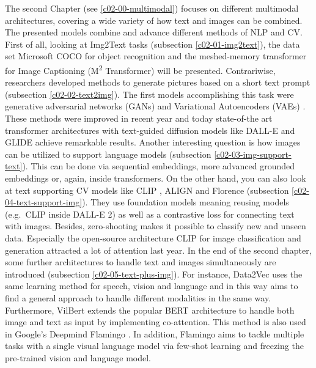 \documentclass[
]{krantz}
\begin{document}
The second Chapter (see \ref{c02-00-multimodal}) focuses on different multimodal architectures, covering a wide variety of how text and images can be combined. The presented models combine and advance different methods of NLP and CV. First of all, looking at Img2Text tasks (subsection \ref{c02-01-img2text}), the data set Microsoft COCO for object recognition \citep{COCO} and the meshed-memory transformer for Image Captioning (M\textsuperscript{2} Transformer) \citep{meshed_memory} will be presented. Contrariwise, researchers developed methods to generate pictures based on a short text prompt (subsection \ref{c02-02-text2img}). The first models accomplishing this task were generative adversarial networks (GANs) \citep{GAN} and Variational Autoencoders (VAEs) \citep{VAE}. These methods were improved in recent year and today state-of-the art transformer architectures with text-guided diffusion models like DALL-E \citep{DALLE} and GLIDE \citep{GLIDE} achieve remarkable results. Another interesting question is how images can be utilized to support language models (subsection \ref{c02-03-img-support-text}). This can be done via sequential embeddings, more advanced grounded embeddings or, again, inside transformers. On the other hand, you can also look at text supporting CV models like CLIP \citep{CLIP}, ALIGN \citep{ALIGN} and Florence \citep{yuan2021florence} (subsection \ref{c02-04-text-support-img}). They use foundation models meaning reusing models (e.g.~CLIP inside DALL-E 2) as well as a contrastive loss for connecting text with images. Besides, zero-shooting makes it possible to classify new and unseen data. Especially the open-source architecture CLIP \citep{CLIP} for image classification and generation attracted a lot of attention last year. In the end of the second chapter, some further architectures to handle text and images simultaneously are introduced (subsection \ref{c02-05-text-plus-img}). For instance, Data2Vec uses the same learning method for speech, vision and language and in this way aims to find a general approach to handle different modalities in the same way. Furthermore, VilBert \citep{VilBert} extends the popular BERT architecture to handle both image and text as input by implementing co-attention. This method is also used in Google's Deepmind Flamingo \citep{Flamingo}. In addition, Flamingo aims to tackle multiple tasks with a single visual language model via few-shot learning and freezing the pre-trained vision and language model.
\end{document}
